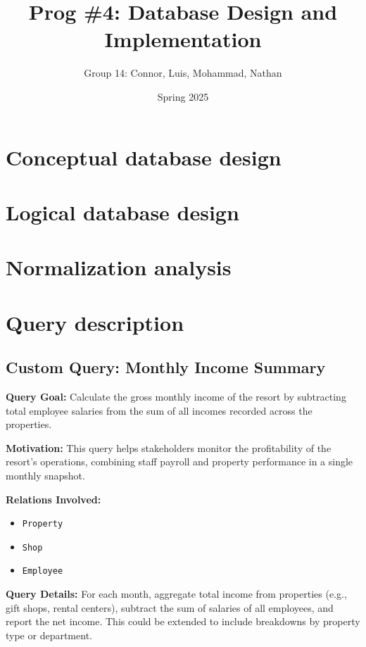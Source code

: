 \documentclass[11pt]{scrartcl}
\title{Prog \#4: Database Design and Implementation}
\author{Group 14: Connor, Luis, Mohammad, Nathan}
\date{Spring 2025}
\begin{document}
\maketitle
\tableofcontents

\section{Conceptual database design}

\section{Logical database design}

\section{Normalization analysis}

\section{Query description}
\subsection{Custom Query: Monthly Income Summary}

\textbf{Query Goal:} Calculate the gross monthly income of the resort by subtracting total employee salaries from the sum of all incomes recorded across the properties.

\textbf{Motivation:} This query helps stakeholders monitor the profitability of the resort’s operations, combining staff payroll and property performance in a single monthly snapshot.

\textbf{Relations Involved:}
\begin{itemize}
  \item \texttt{Property}
  \item \texttt{Shop}
  \item \texttt{Employee}
\end{itemize}

\textbf{Query Details:} For each month, aggregate total income from properties (e.g., gift shops, rental centers), subtract the sum of salaries of all employees, and report the net income. This could be extended to include breakdowns by property type or department.
\end{document}
